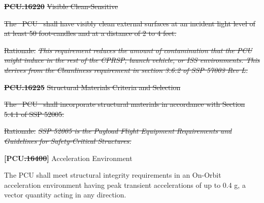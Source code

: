 \documentclass[12pt,oneside,oldfontcommands]{memoir}
\providecommand{\DIFaddtex}[1]{{\protect\color{blue}\uwave{#1}}} %
\providecommand{\DIFdeltex}[1]{{\protect\color{red}\sout{#1}}}                      %
\providecommand{\DIFaddbegin}{} %
\providecommand{\DIFaddend}{} %
\providecommand{\DIFdelbegin}{} %
\providecommand{\DIFdelend}{} %
\providecommand{\DIFadd}[1]{\texorpdfstring{\DIFaddtex{#1}}{#1}} %
\providecommand{\DIFdel}[1]{\texorpdfstring{\DIFdeltex{#1}}{}} %
\newcommand{\DIFscaledelfig}{0.5}
\newlength{\DIFdelgraphicswidth} %
\newlength{\DIFdelgraphicsheight} %
\newcommand{\DIFaddincludegraphics}[2][]{{\color{blue}\fbox{\DIFOincludegraphics[#1]{#2}}}} %
\newcommand{\DIFdelincludegraphics}[2][]{%
\sbox{\DIFdelgraphicsbox}{\DIFOincludegraphics[#1]{#2}}%
\settoboxwidth{\DIFdelgraphicswidth}{\DIFdelgraphicsbox} %
\settoboxtotalheight{\DIFdelgraphicsheight}{\DIFdelgraphicsbox} %
\scalebox{\DIFscaledelfig}{%
\parbox[b]{\DIFdelgraphicswidth}{\usebox{\DIFdelgraphicsbox}\\[-\baselineskip] \rule{\DIFdelgraphicswidth}{0em}}\llap{\resizebox{\DIFdelgraphicswidth}{\DIFdelgraphicsheight}{%
\setlength{\unitlength}{\DIFdelgraphicswidth}%
\begin{picture}(1,1)%
\thicklines\linethickness{2pt} %
{\color[rgb]{1,0,0}\put(0,0){\framebox(1,1){}}}%
{\color[rgb]{1,0,0}\put(0,0){\line( 1,1){1}}}%
{\color[rgb]{1,0,0}\put(0,1){\line(1,-1){1}}}%
\end{picture}%
}\hspace*{3pt}}} %
} %
\DeclareRobustCommand{\DIFaddbegin}{\DIFOaddbegin \let\includegraphics\DIFaddincludegraphics} %
\DeclareRobustCommand{\DIFaddend}{\DIFOaddend \let\includegraphics\DIFOincludegraphics} %
\DeclareRobustCommand{\DIFdelbegin}{\DIFOdelbegin \let\includegraphics\DIFdelincludegraphics} %
\DeclareRobustCommand{\DIFdelend}{\DIFOaddend \let\includegraphics\DIFOincludegraphics} %
\begin{document}
\textbf{%
\DIFdel{PCU.16220}%
} %
\DIFdel{Visible Clean-Sensitive
}%

\DIFdel{The \mbox{%
\gls{PCU} }\hspace{0pt}%
shall have visibly clean external surfaces at an incident light level of at least 50 foot-candles and at a distance of 2 to 4 feet.
}%

\begin{itemize}%
\DIFdel{Rationale: }\emph{\DIFdel{This requirement reduces the amount of contamination that the PCU might induce in the rest of the CPRSP, launch vehicle, or ISS environments. This derives from the Cleanliness requirement in section 3.6.2 of SSP 57003 Rev L.}}


\end{itemize}%

\textbf{%
\DIFdel{PCU.16225}%
} %
\DIFdel{Structural Materials Criteria and Selection
}%

\DIFdel{The \mbox{%
\gls{PCU} }\hspace{0pt}%
shall incorporate structural materials in accordance with Section 5.4.1 of SSP 52005.
}%

\begin{itemize}%
\DIFdel{Rationale: }\emph{\DIFdel{SSP 52005 is the Payload Flight Equipment Requirements and Guidelines for Safety-Critical Structures.}}


\end{itemize}%

\DIFdelend \textbf{[PCU\DIFdelbegin \DIFdel{.16400}\DIFdelend \DIFaddbegin \DIFadd{.16140}\DIFaddend ]} Acceleration Environment

The \gls{PCU} shall meet structural integrity requirements in an On-Orbit acceleration environment having peak transient accelerations of up to 0.4 g, a vector quantity acting in any direction.
\end{document}
